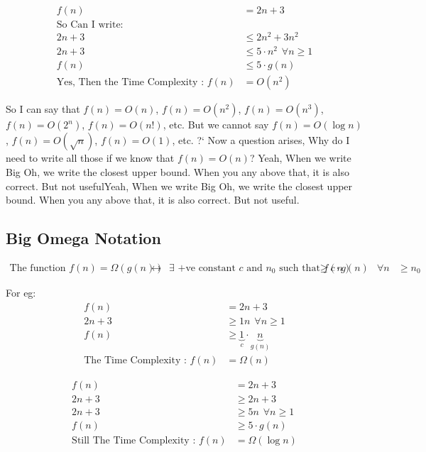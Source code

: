 \documentclass[]{article}
\begin{document}
\[
\begin{aligned}
    f(n) &= 2n + 3 \\
    \text{So Can I write: }\\
        2n+3 &\leq 2n^2 + 3n^2\\ 
        2n+3 &\leq 5\cdot n^2 \hspace{5pt} \forall n \geq 1 \\
        f(n) &\leq 5 \cdot g(n) \\
        \text{Yes, Then the Time Complexity : } f(n) &= O(n^2)
\end{aligned}
\]

So I can say that $f(n) = O(n)$, $f(n) = O(n^2)$, $f(n) = O(n^3)$, $f(n) = O(2^n)$, $f(n) = O(n!)$, etc.
But we cannot say $f(n) = O(\log{n})$, $f(n) = O(\sqrt{n})$, $f(n) = O(1)$, etc.
\newline
\newline
?` Now a question arises, Why do I need to write all those if we know that $f(n) = O(n)$? 
Yeah, When we write Big Oh, we write the closest upper bound. When you any above that, it is also correct. But not usefulYeah, When we write Big Oh, we write the closest upper bound. When you any above that, it is also correct. But not useful.

\subsection{Big Omega Notation}
\[
\begin{aligned}
        \text{The function } f(n) = \Omega{(g(n))} &\leftrightarrow &\exists \text{ +ve constant $c$ and } 
        n_0 \text{ such that } f{(n)} &\geq c \cdot g{(n)} &\forall n &\geq n_0
\end{aligned}
\]

For eg:
\[
\begin{aligned}
        f(n) &= 2n + 3 \\
        2n+3 &\geq 1n \hspace{5pt} \forall n \geq 1 \\
        f(n) &\geq \underbrace{1}_c \cdot \underbrace{n}_{g(n)}\\
        \text{The Time Complexity : } f(n) &= \Omega(n)
\end{aligned}
\]

\[
\begin{aligned}
        f(n) &= 2n + 3 \\
        2n+3 &\geq 2n + 3 \\
        2n+3 &\geq 5n \hspace{5pt} \forall n \geq 1 \\
        f(n) &\geq 5 \cdot g(n) \\
        \text{Still The Time Complexity : } f(n) &= \Omega(\log{n})
\end{aligned}
\]
\end{document}
